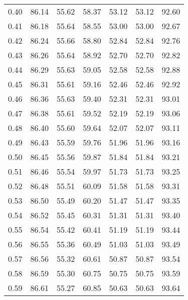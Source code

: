 \begin{tabular}{|c|c|c|c|c|c|c|}
      0.40 &     86.14 &     55.62 &      58.37 &   53.12 &      53.12 &         92.60 \\
      0.41 &     86.18 &     55.64 &      58.55 &   53.00 &      53.00 &         92.67 \\
      0.42 &     86.24 &     55.66 &      58.80 &   52.84 &      52.84 &         92.76 \\
      0.43 &     86.26 &     55.64 &      58.92 &   52.70 &      52.70 &         92.82 \\
      0.44 &     86.29 &     55.63 &      59.05 &   52.58 &      52.58 &         92.88 \\
      0.45 &     86.31 &     55.61 &      59.16 &   52.46 &      52.46 &         92.92 \\
      0.46 &     86.36 &     55.63 &      59.40 &   52.31 &      52.31 &         93.01 \\
      0.47 &     86.38 &     55.61 &      59.52 &   52.19 &      52.19 &         93.06 \\
      0.48 &     86.40 &     55.60 &      59.64 &   52.07 &      52.07 &         93.11 \\
      0.49 &     86.43 &     55.59 &      59.76 &   51.96 &      51.96 &         93.16 \\
      0.50 &     86.45 &     55.56 &      59.87 &   51.84 &      51.84 &         93.21 \\
      0.51 &     86.46 &     55.54 &      59.97 &   51.73 &      51.73 &         93.25 \\
      0.52 &     86.48 &     55.51 &      60.09 &   51.58 &      51.58 &         93.31 \\
      0.53 &     86.50 &     55.49 &      60.20 &   51.47 &      51.47 &         93.35 \\
      0.54 &     86.52 &     55.45 &      60.31 &   51.31 &      51.31 &         93.40 \\
      0.55 &     86.54 &     55.42 &      60.41 &   51.19 &      51.19 &         93.44 \\
      0.56 &     86.55 &     55.36 &      60.49 &   51.03 &      51.03 &         93.49 \\
      0.57 &     86.56 &     55.32 &      60.61 &   50.87 &      50.87 &         93.54 \\
      0.58 &     86.59 &     55.30 &      60.75 &   50.75 &      50.75 &         93.59 \\
      0.59 &     86.61 &     55.27 &      60.85 &   50.63 &      50.63 &         93.64 \\

\end{tabular}
